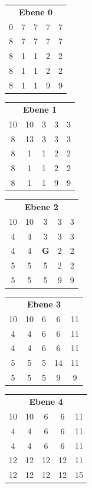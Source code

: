 \documentclass[11pt,a4paper,parskip=half]{scrartcl}
\newcommand{\gold}{\cellcolor{goldcol}\textbf{G}}
\begin{document}
\begin{center}\footnotesize\setlength{\tabcolsep}{3pt}
\begin{tabular}[t]{@{}ccccc@{}}
\multicolumn{5}{c}{\textbf{Ebene 0}}\\
0 & 7 & 7 & 7 & 7\\
8 & 7 & 7 & 7 & 7\\
8 & 1 & 1 & 2 & 2\\
8 & 1 & 1 & 2 & 2\\
8 & 1 & 1 & 9 & 9\\
\end{tabular}\hspace{0.9em}
\begin{tabular}[t]{@{}ccccc@{}}
\multicolumn{5}{c}{\textbf{Ebene 1}}\\
10 & 10 & 3 & 3 & 3\\
8 & 13 & 3 & 3 & 3\\
8 & 1 & 1 & 2 & 2\\
8 & 1 & 1 & 2 & 2\\
8 & 1 & 1 & 9 & 9\\
\end{tabular}\hspace{0.9em}
\begin{tabular}[t]{@{}ccccc@{}}
\multicolumn{5}{c}{\textbf{Ebene 2}}\\
10 & 10 & 3 & 3 & 3\\
4 & 4 & 3 & 3 & 3\\
4 & 4 & \gold & 2 & 2\\
5 & 5 & 5 & 2 & 2\\
5 & 5 & 5 & 9 & 9\\
\end{tabular}\hspace{0.9em}
\begin{tabular}[t]{@{}ccccc@{}}
\multicolumn{5}{c}{\textbf{Ebene 3}}\\
10 & 10 & 6 & 6 & 11\\
4 & 4 & 6 & 6 & 11\\
4 & 4 & 6 & 6 & 11\\
5 & 5 & 5 & 14 & 11\\
5 & 5 & 5 & 9 & 9\\
\end{tabular}\hspace{0.9em}
\begin{tabular}[t]{@{}ccccc@{}}
\multicolumn{5}{c}{\textbf{Ebene 4}}\\
10 & 10 & 6 & 6 & 11\\
4 & 4 & 6 & 6 & 11\\
4 & 4 & 6 & 6 & 11\\
12 & 12 & 12 & 12 & 11\\
12 & 12 & 12 & 12 & 15\\
\end{tabular}\hspace{0.9em}
\end{center}
\end{document}
